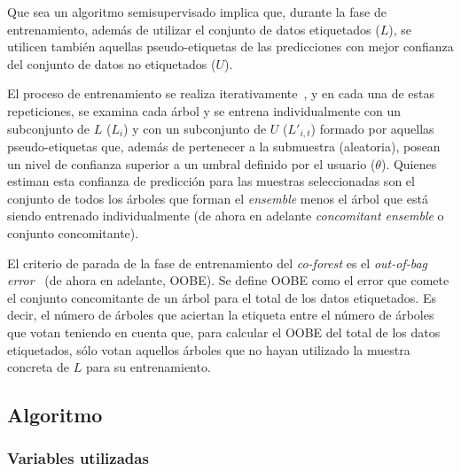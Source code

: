 Que sea un algoritmo semisupervisado implica que, durante la fase de entrenamiento, además de utilizar el conjunto de datos etiquetados ($L$), se utilicen también aquellas pseudo-etiquetas de las predicciones con mejor confianza del conjunto de datos no etiquetados ($U$).

El proceso de entrenamiento se realiza iterativamente~\cite{engelen2018thesis}, y en cada una de estas repeticiones, se examina cada árbol y se entrena individualmente con un subconjunto de $L$ ($L_{i}$) y con un subconjunto de $U$ ($L'_{i,t}$) formado por aquellas pseudo-etiquetas que, además de pertenecer a la submuestra (aleatoria), posean un nivel de confianza superior a un umbral definido por el usuario ($\theta$). Quienes estiman esta confianza de predicción para las muestras seleccionadas son el conjunto de todos los árboles que forman el \textit{ensemble} menos el árbol que está siendo entrenado individualmente (de ahora en adelante \textit{concomitant ensemble} o conjunto concomitante).

El criterio de parada de la fase de entrenamiento del \textit{co-forest} es el \textit{out-of-bag error}~\cite{zhou2021SemisupervisedRecommendationAttack} (de ahora en adelante, OOBE). Se define OOBE como el error que comete el conjunto concomitante de un árbol para el total de los datos etiquetados. Es decir, el número de árboles que aciertan la etiqueta entre el número de árboles que votan teniendo en cuenta que, para calcular el OOBE del total de los datos etiquetados, sólo votan aquellos árboles que no hayan utilizado la muestra concreta de $L$ para su entrenamiento.


\subsection{Algoritmo}


\subsubsection{Variables utilizadas}

